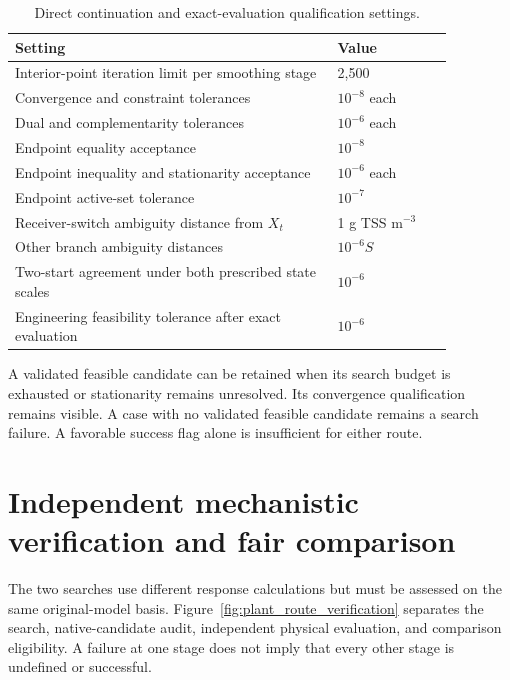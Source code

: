 \begin{table}[htbp]
\centering\small
\caption{Direct continuation and exact-evaluation qualification settings.}\label{tab:plant_direct_settings}
\begin{tabular}{p{0.64\linewidth}p{0.23\linewidth}}
\toprule Setting & Value\\\midrule
Interior-point iteration limit per smoothing stage & 2{,}500\\
Convergence and constraint tolerances & $10^{-8}$ each\\
Dual and complementarity tolerances & $10^{-6}$ each\\
Endpoint equality acceptance & $10^{-8}$\\
Endpoint inequality and stationarity acceptance & $10^{-6}$ each\\
Endpoint active-set tolerance & $10^{-7}$\\
Receiver-switch ambiguity distance from $X_t$ & 1 g TSS m$^{-3}$\\
Other branch ambiguity distances & $10^{-6}S$\\
Two-start agreement under both prescribed state scales & $10^{-6}$\\
Engineering feasibility tolerance after exact evaluation & $10^{-6}$\\
\bottomrule
\end{tabular}
\end{table}

A validated feasible candidate can be retained when its search budget is exhausted or stationarity remains unresolved. Its convergence qualification remains visible. A case with no validated feasible candidate remains a search failure. A favorable success flag alone is insufficient for either route.

\section{Independent mechanistic verification and fair comparison}

The two searches use different response calculations but must be assessed on the same original-model basis. Figure~\ref{fig:plant_route_verification} separates the search, native-candidate audit, independent physical evaluation, and comparison eligibility. A failure at one stage does not imply that every other stage is undefined or successful.

